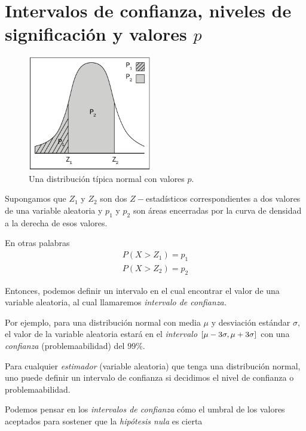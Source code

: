 \section{Intervalos de confianza, niveles de significación y valores $p$}

\begin{figure}
	\centering
	\includegraphics[height=5cm,keepaspectratio=true]{./images/kum0401.png}
	\caption{Una distribución típica normal con valores $p.$}
	\label{fig:0401}
\end{figure}



Supongamos que $Z_{1}$ y $Z_{2}$ son dos $Z-$estadísticos correspondientes a dos valores de una variable aleatoria y $p_{1}$ y $p_{2}$ son áreas encerradas por la curva de densidad a la derecha de esos valores.

En otras palabras
\begin{align}
	P(X>Z_{1})=p_{1}\\
	P(X>Z_{2})=p_{2}
\end{align}



Entonces, podemos definir un intervalo en el cual encontrar el valor de una variable aleatoria, al cual llamaremos \emph{intervalo de confianza.}


Por ejemplo, para una distribución normal con media $\mu$ y desviación estándar $\sigma,$ el valor de la variable aleatoria estará en el \emph{intervalo} $[\mu-3\sigma,\mu+3\sigma]$ con una \emph{confianza} (problemaabilidad) del $99\%.$


Para cualquier \emph{estimador} (variable aleatoria) que tenga una distribución normal, uno puede definir un intervalo de confianza si decidimos el nivel de confianza o problemaabilidad.


Podemos pensar en los \emph{intervalos de confianza} cómo el umbral de los valores aceptados para sostener que la \emph{hipótesis nula} es cierta


